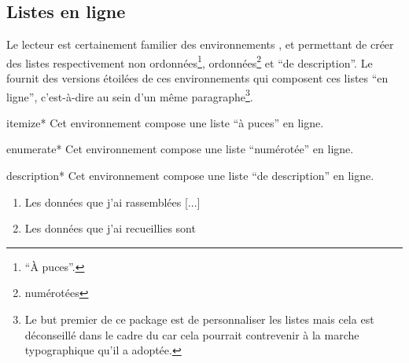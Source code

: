 \documentclass[french,nolocaltoc]{nwejmart}
\newtheorem[title=Fait,style=definition]{fact}
\begin{document}
\subsection{Listes en ligne}
\label{sec:listes-en-ligne}

Le lecteur est certainement familier des environnements
,  et
 permettant de créer des listes respectivement
non ordonnées\footnote{\enquote{À puces}.}, ordonnées\footnote{\Ie*{}
  numérotées} et \enquote{de description}. Le  fournit des
versions étoilées de ces environnements qui composent ces listes \enquote{en
  ligne}, c'est-à-dire au sein d'un même paragraphe\footnote{Le but premier de
  ce package est de personnaliser les listes mais cela est déconseillé dans le
  cadre du \nwejm{} car cela pourrait contrevenir à la marche typographique
  qu'il a adoptée.}.

\begin{docEnvironment}[doclang/environment content=liste]{itemize*}{}
  Cet environnement compose une liste \enquote{à puces} en ligne.
\end{docEnvironment}
\begin{docEnvironment}[doclang/environment content=liste]{enumerate*}{}
  Cet environnement compose une liste \enquote{numérotée} en ligne.
\end{docEnvironment}
\begin{docEnvironment}[doclang/environment content=liste]{description*}{}
  Cet environnement compose une liste \enquote{de description} en ligne.
\end{docEnvironment}

\begin{bodycode}[listing and text,listing options={alsolanguage={[hyperref]TeX},deletekeywords={math},deletekeywords={[2]url}}]
\begin{enumerate}
\item Les données que j’ai rassemblées [...]
\item Les données que j’ai recueillies sont
\end{enumerate}
\end{bodycode}
\end{document}
